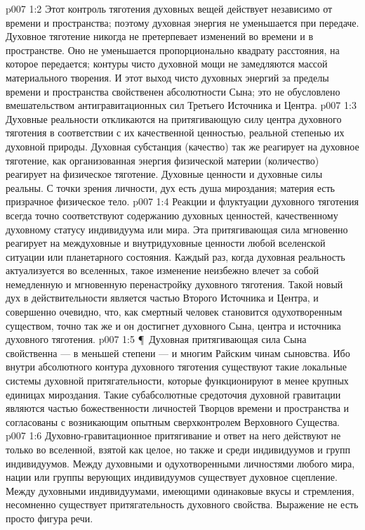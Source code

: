\vs p007 1:2 Этот контроль тяготения духовных вещей действует независимо от времени и пространства; поэтому духовная энергия не уменьшается при передаче. Духовное тяготение никогда не претерпевает изменений во времени и в пространстве. Оно не уменьшается пропорционально квадрату расстояния, на которое передается; контуры чисто духовной мощи не замедляются массой материального творения. И этот выход чисто духовных энергий за пределы времени и пространства свойственен абсолютности Сына; это не обусловлено вмешательством антигравитационных сил Третьего Источника и Центра.
\vs p007 1:3 Духовные реальности откликаются на притягивающую силу центра духовного тяготения в соответствии с их качественной ценностью, реальной степенью их духовной природы. Духовная субстанция (качество) так же реагирует на духовное тяготение, как организованная энергия физической материи (количество) реагирует на физическое тяготение. Духовные ценности и духовные силы реальны. С точки зрения личности, дух есть душа мироздания; материя есть призрачное физическое тело.
\vs p007 1:4 Реакции и флуктуации духовного тяготения всегда точно соответствуют содержанию духовных ценностей, качественному духовному статусу индивидуума или мира. Эта притягивающая сила мгновенно реагирует на междуховные и внутридуховные ценности любой вселенской ситуации или планетарного состояния. Каждый раз, когда духовная реальность актуализуется во вселенных, такое изменение неизбежно влечет за собой немедленную и мгновенную перенастройку духовного тяготения. Такой новый дух в действительности является частью Второго Источника и Центра, и совершенно очевидно, что, как смертный человек становится одухотворенным существом, точно так же и он достигнет духовного Сына, центра и источника духовного тяготения.
\vs p007 1:5 \P\ Духовная притягивающая сила Сына свойственна --- в меньшей степени --- и многим Райским чинам сыновства. Ибо внутри абсолютного контура духовного тяготения существуют такие локальные системы духовной притягательности, которые функционируют в менее крупных единицах мироздания. Такие субабсолютные средоточия духовной гравитации являются частью божественности личностей Творцов времени и пространства и согласованы с возникающим опытным сверхконтролем Верховного Существа.
\vs p007 1:6 Духовно\hyp{}гравитационное притягивание и ответ на него действуют не только во вселенной, взятой как целое, но также и среди индивидуумов и групп индивидуумов. Между духовными и одухотворенными личностями любого мира, нации или группы верующих индивидуумов существует духовное сцепление. Между духовными индивидуумами, имеющими одинаковые вкусы и стремления, несомненно существует притягательность духовного свойства. Выражение  не есть просто фигура речи.

